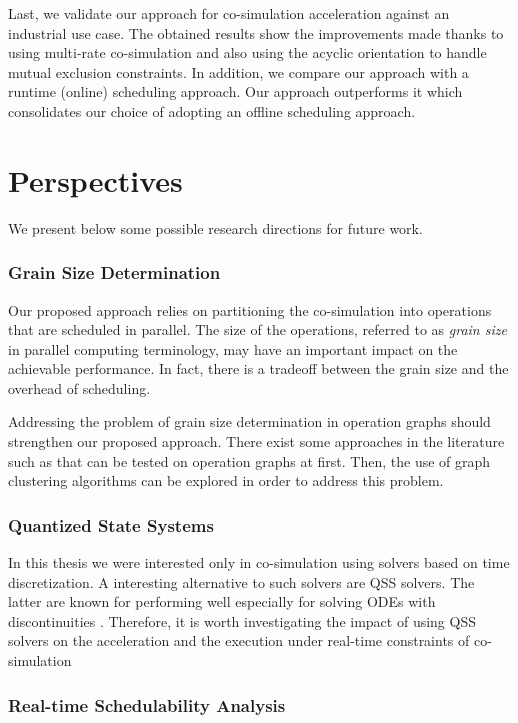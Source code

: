 Last, we validate our approach for co-simulation acceleration against an industrial use case. The obtained results show the improvements made thanks to using multi-rate co-simulation and also using the acyclic orientation to handle mutual exclusion constraints. In addition, we compare our approach with a runtime (online) scheduling approach. Our approach outperforms it which consolidates our choice of adopting an offline scheduling approach.               

\section{Perspectives}

We present below some possible research directions for future work.

\subsubsection{Grain Size Determination}

Our proposed approach relies on partitioning the co-simulation into operations that are scheduled in parallel. The size of the operations, referred to as \textit{grain size} in parallel computing terminology, may have an important impact on the achievable performance. In fact, there is a tradeoff between the grain size and the overhead of scheduling.

Addressing the problem of grain size determination in operation graphs should strengthen our proposed approach. There exist some approaches in the literature such as \cite{kruatrachue:1988} that can be tested on operation graphs at first. Then, the use of graph clustering algorithms can be explored in order to address this problem.

\subsubsection{Quantized State Systems}

In this thesis we were interested only in co-simulation using solvers based on time discretization. A interesting alternative to such solvers are QSS solvers. The latter are known for performing well especially for solving ODEs with discontinuities \cite{migoni:2012}. Therefore, it is worth investigating the impact of using QSS solvers on the acceleration and the execution under real-time constraints of co-simulation  

\subsubsection{Real-time Schedulability Analysis}

